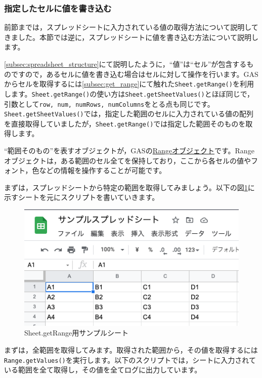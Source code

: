 \documentclass[uplatex,a4j]{jsarticle}
\begin{document}
\subsubsection{指定したセルに値を書き込む}

前節までは，スプレッドシートに入力されている値の取得方法について説明してきました。本節では逆に，スプレッドシートに値を書き込む方法について説明します。

\ref{subsec:spreadsheet_structure}にて説明したように，``値''は``セル''が包含するものですので，あるセルに値を書き込む場合はセルに対して操作を行います。GASからセルを取得するには\ref{subsec:get_range}にて触れた\verb|Sheet.getRange()|を利用します。\verb|Sheet.getRange()|の使い方は\verb|Sheet.getSheetValues()|とほぼ同じで，引数として\verb|row, num, numRows, numColumns|をとる点も同じです。\verb|Sheet.getSheetValues()|では，指定した範囲のセルに入力されている値の配列を直接取得していましたが，\verb|Sheet.getRange()|では指定した範囲そのものを取得します。

``範囲そのもの''を表すオブジェクトが，GASの\href{https://developers.google.com/apps-script/reference/spreadsheet/range}{Rangeオブジェクト}です。Rangeオブジェクトは，ある範囲のセル全てを保持しており，ここから各セルの値やフォント，色などの情報を操作することが可能です。

まずは，スプレッドシートから特定の範囲を取得してみましょう。以下の図\ref{fig:getrange_sample_sheet}に示すシートを元にスクリプトを書いていきます。

\begin{figure}[H]
 \centering
 \includegraphics[keepaspectratio, scale=0.7]{images/getrange_sample_sheet.png}
 \caption{Sheet.getRange用サンプルシート}
 \label{fig:getrange_sample_sheet}
\end{figure}

まずは，全範囲を取得してみます。取得された範囲から，その値を取得するには\verb|Range.getValues()|を実行します。以下のスクリプトでは，シートに入力されている範囲を全て取得し，その値を全てログに出力しています。
\end{document}
